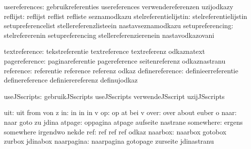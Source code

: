                 usereferences:  gebruikreferenties           usereferences
                                verwendereferenzen           uzijodkazy
                     reflijst:  reflijst                     reflist
                                refliste                     seznamodkazu
        stelreferentielijstin:  stelreferentielijstin        setupreferencelist
                                stellereferenzlisteein       nastavseznamodkazu
             setupreferencing:  stelrefererenin              setupreferencing
                                stellereferenzierenein       nastavodkazovani

                textreference:  tekstreferentie              textreference
                                textreferenz                 odkaznatext
                pagereference:  paginareferentie             pagereference
                                seitenreferenz               odkaznastranu
                    reference:  referentie                   reference
                                referenz                     odkaz
              definereference:  definieerreferentie          definereference
                                definierereferenz            definujodkaz

                 useJSscripts:  gebruikJSscripts             useJSscripts
                                verwendeJSscript             uzijJSscripts

                          uit:  uit                          from
                                von                          z
                           in:  in                           in
                                in                           v
                           op:  op                           at
                                bei                          v
                         over:  over                         about
                                euber                        o
                         naar:  naar                         goto
                                zu                           jdina
                       atpage:  oppagina                     atpage
                                aufseite                     nastrane
                    somewhere:  ergens                       somewhere
                                irgendwo                     nekde
                          ref:  ref                          ref
                                ref                          odkaz
                      naarbox:  naarbox                      gotobox
                                zurbox                       jdinabox
                   naarpagina:  naarpagina                   gotopage
                                zurseite                     jdinastranu

